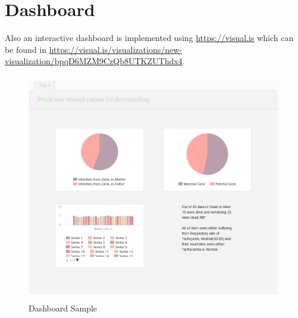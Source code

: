 \section{Dashboard}
Also an interactive dashboard is implemented using \url{https://visual.is} which can be found in \url{https://visual.is/visualizations/new-visualization/bpqD6MZM9CzQb8UTKZUThdx4}.\\
\begin{figure}[htpb]
	\centering
	\includegraphics[height=10cm, width=12cm]{figures/dash.png}
	\caption{Dashboard Sample}
	\label{fig 28}
\end{figure}